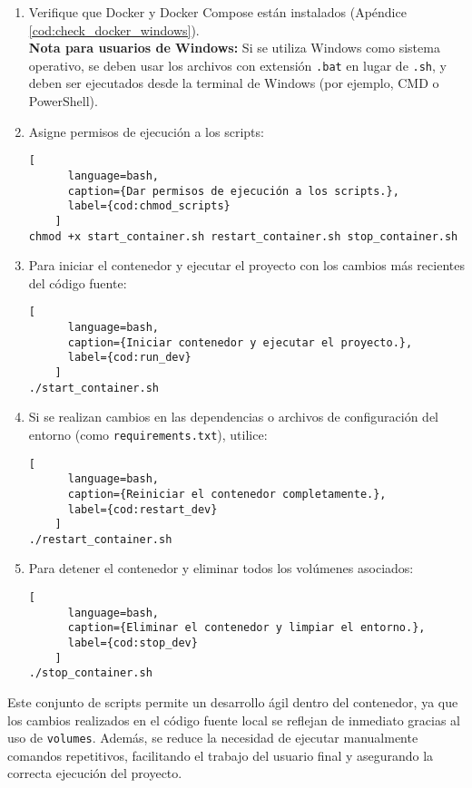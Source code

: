 \begin{enumerate}
    \item Verifique que Docker y Docker Compose están instalados (Apéndice \ref{cod:check_docker_windows}).\\
    {\footnotesize \textbf{Nota para usuarios de Windows:} Si se utiliza Windows como sistema operativo, se deben usar los archivos con extensión \texttt{.bat} en lugar de \texttt{.sh}, y deben ser ejecutados desde la terminal de Windows (por ejemplo, CMD o PowerShell).}

    \item Asigne permisos de ejecución a los scripts:
    \begin{lstlisting}[
      language=bash,
      caption={Dar permisos de ejecución a los scripts.},
      label={cod:chmod_scripts}
    ]
chmod +x start_container.sh restart_container.sh stop_container.sh
    \end{lstlisting}
    \item Para iniciar el contenedor y ejecutar el proyecto con los cambios más recientes del código fuente:
    \begin{lstlisting}[
      language=bash,
      caption={Iniciar contenedor y ejecutar el proyecto.},
      label={cod:run_dev}
    ]
./start_container.sh
    \end{lstlisting}
    \item Si se realizan cambios en las dependencias o archivos de configuración del entorno (como \texttt{requirements.txt}), utilice:
    \begin{lstlisting}[
      language=bash,
      caption={Reiniciar el contenedor completamente.},
      label={cod:restart_dev}
    ]
./restart_container.sh
    \end{lstlisting}
    \item Para detener el contenedor y eliminar todos los volúmenes asociados:
    \begin{lstlisting}[
      language=bash,
      caption={Eliminar el contenedor y limpiar el entorno.},
      label={cod:stop_dev}
    ]
./stop_container.sh
    \end{lstlisting}
\end{enumerate}

Este conjunto de scripts permite un desarrollo ágil dentro del contenedor, ya que los cambios realizados en el código fuente local se reflejan de inmediato gracias al uso de \texttt{volumes}. Además, se reduce la necesidad de ejecutar manualmente comandos repetitivos, facilitando el trabajo del usuario final y asegurando la correcta ejecución del proyecto.
